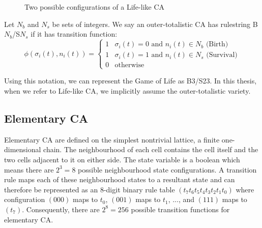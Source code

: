 \begin{figure}[!h]
  \centering
  \hfill
  \hfill
  \hfill\hfill
  \caption{Two possible configurations of a Life-like CA}
  \label{fig:two-moores}
\end{figure}

\begin{definition}
Let $N_b$ and $N_s$ be sets of integers. We say an outer-totalistic CA has rulestring \textnormal{B$N_b$/S$N_s$} if it has transition function:
\[
  \phi(\sigma_i(t), n_i(t)) = 
  \begin{cases}
    1 & \sigma_i(t) = 0 \text{ and } n_i(t) \in N_b \text{  (Birth)}\\
    1 & \sigma_i(t) = 1 \text{ and } n_i(t) \in N_s \text{  (Survival)}\\
    0 & \text{otherwise}
  \end{cases}
\]
\label{def:bs-notation}
\end{definition}

Using this notation, we can represent the Game of Life as B3/S23. In this thesis, when we refer to Life-like CA, we implicitly assume the outer-totalistic variety.

\subsection{Elementary CA} 
Elementary CA are defined on the simplest nontrivial lattice, a finite one-dimensional chain. The neighbourhood of each cell contains the cell itself and the two cells adjacent to it on either side. The state variable is a boolean which means there are $2^3 = 8$ possible neighbourhood state configurations. A transition rule maps each of these neighbourhood states to a resultant state and can therefore be represented as an 8-digit binary rule table $(t_7t_6t_5t_4t_3t_2t_1t_0)$ where configuration $(000)$ maps to $t_0$, $(001)$ maps to $t_1$, ..., and $(111)$ maps to $(t_7)$. Consequently, there are $2^8=256$ possible transition functions for elementary CA.\\

